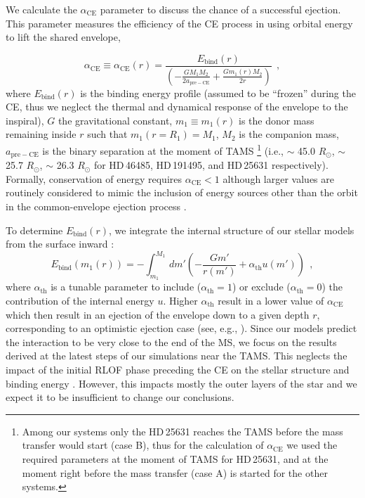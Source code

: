 \documentclass{aa}
\begin{document}
We calculate the $\alpha_\mathrm{CE}$ parameter
  \citep{webbink:1984} to discuss the chance of a successful ejection.
  This parameter measures the efficiency of the CE process in using
  orbital energy to lift the shared envelope,

\begin{equation}
  \label{eq:alpha_CE}
  \alpha_\mathrm{CE} \equiv \alpha_\mathrm{CE}(r) = \frac{E_\mathrm{bind}(r)}{\left(-\frac{GM_1M_2}{2a_\mathrm{pre-CE}}+ \frac{Gm_1(r) M_2}{2r}\right)} \ \ ,
\end{equation}
where $E_\mathrm{bind}(r)$ is the binding energy profile (assumed
  to be ``frozen'' during the CE, thus we neglect the thermal and dynamical response of the envelope to the inspiral), $G$ the gravitational constant, $m_1\equiv m_1(r)$ is the donor mass remaining inside
$r$ such that $m_1(r=R_1)=M_1$, $M_2$ is the companion mass,
$a_\mathrm{pre-CE}$ is the binary separation at the moment of TAMS \footnote{Among our systems only the HD\,25631 reaches the TAMS before the mass transfer would start (case B), thus for the calculation of $\alpha_\mathrm{CE}$ we used the required parameters at the moment of TAMS for HD\,25631, and at the moment right before the mass transfer (case A)  is started for the other systems.} (i.e., $\sim$ 45.0 $R_{\odot}$, $\sim$ 25.7 $R_{\odot}$, $\sim$ 26.3 $R_{\odot}$ for HD\,46485, HD\,191495, and HD\,25631 respectively).
Formally, conservation of energy requires
  $\alpha_\mathrm{CE}<1$ \citep{Iaconi_2019} although larger
  values are routinely considered to mimic the inclusion of energy
  sources other than the orbit in the common-envelope ejection
  process \citep{Han_1995, ivanova:02, demarco:11, zorotovic:14}.

To determine $E_\mathrm{bind}(r)$, we integrate the internal structure of our stellar models from the surface inward
  \citep[e.g.,][]{Han_1995, Dewi_2000, renzo:23}:
\begin{equation}
  \label{eq:BE}
E_\mathrm{bind}(m_1(r)) = - \int_{m_1}^{M_1}\,dm'\left( -\frac{G m'}{r(m')}+\alpha_\mathrm{th}u(m')\right) \ \ ,
\end{equation}
where $\alpha_\mathrm{th}$ is a tunable parameter to include
  ($\alpha_\mathrm{th}=1$) or exclude ($\alpha_\mathrm{th}=0$) the
  contribution of the internal energy $u$. Higher $\alpha_\mathrm{th}$
  result in a lower value of $\alpha_\mathrm{CE}$ which then result in an ejection of
  the envelope down to a given depth $r$,
  corresponding to an optimistic ejection case (see, e.g.,
  \citealt{klencki:21}). Since our models predict the interaction to
  be very close to the end of the MS, we focus on the results derived
at the latest steps of our simulations near the TAMS. This
  neglects the impact of the initial RLOF
  phase preceding the CE on the stellar structure and binding energy \citep[e.g.,][]{ivanova:2020, renzo:21gwce,
    blagorodnova:21}. However, this impacts mostly the outer layers of
the star and we expect it to be insufficient to change our
conclusions.
\end{document}
